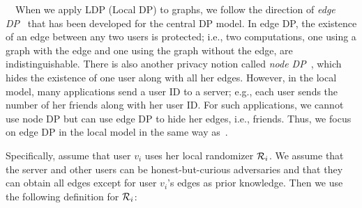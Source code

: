 

{}~~When 
% 
we apply LDP (Local DP) to graphs, 
we follow the direction of \textit{edge DP}~\cite{Nissim_STOC07,Raskhodnikova_Encyclopedia16} that has been developed for the central DP model. 
In 
edge DP, 
the existence of an edge
between any two users is protected; i.e., two computations, one using a graph with the
edge and one using the graph without the edge, 
are indistinguishable. 
There is also another privacy notion called \textit{node DP}~\cite{Hay_ICDM09,Zhang_USENIX20}, which hides the existence of one user along with 
all her edges. 
However, in the local model, many applications send a user ID to a server; e.g., each user sends the number of her friends along with her user ID. 
For such applications, we cannot use node DP but can use edge DP to hide her edges, i.e., friends. 
Thus, we focus on edge DP in the local model in the same way as~\cite{Imola_USENIX21,Qin_CCS17,Sun_CCS19,Ye_ICDE20,Ye_TKDE21}. 

Specifically, 
assume that user $v_i$ uses her local randomizer $\mathcal{R}_i$. 
We assume that the server and other users can be 
honest-but-curious adversaries and that they can obtain all edges except for user $v_i$'s edges 
as prior knowledge. 
Then we 
use the following definition for $\mathcal{R}_i$:


